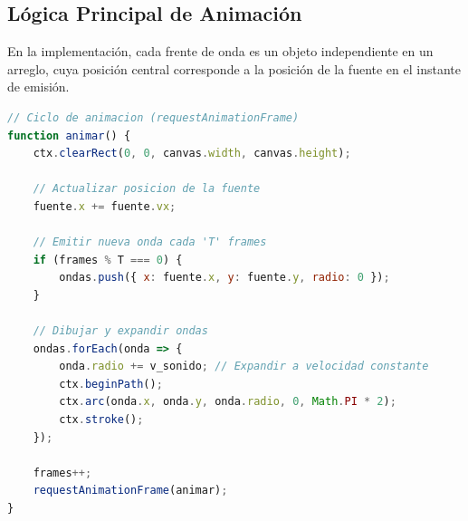 \documentclass[12pt,a4paper]{article}
\begin{document}
\subsection{Lógica Principal de Animación}
En la implementación, cada frente de onda es un objeto independiente en un arreglo, cuya posición central corresponde a la posición de la fuente en el instante de emisión.
\begin{lstlisting}[language=JavaScript]
// Ciclo de animacion (requestAnimationFrame)
function animar() {
    ctx.clearRect(0, 0, canvas.width, canvas.height);
    
    // Actualizar posicion de la fuente
    fuente.x += fuente.vx;
    
    // Emitir nueva onda cada 'T' frames
    if (frames % T === 0) {
        ondas.push({ x: fuente.x, y: fuente.y, radio: 0 });
    }
    
    // Dibujar y expandir ondas
    ondas.forEach(onda => {
        onda.radio += v_sonido; // Expandir a velocidad constante
        ctx.beginPath();
        ctx.arc(onda.x, onda.y, onda.radio, 0, Math.PI * 2);
        ctx.stroke();
    });
    
    frames++;
    requestAnimationFrame(animar);
}
\end{lstlisting}
\end{document}
